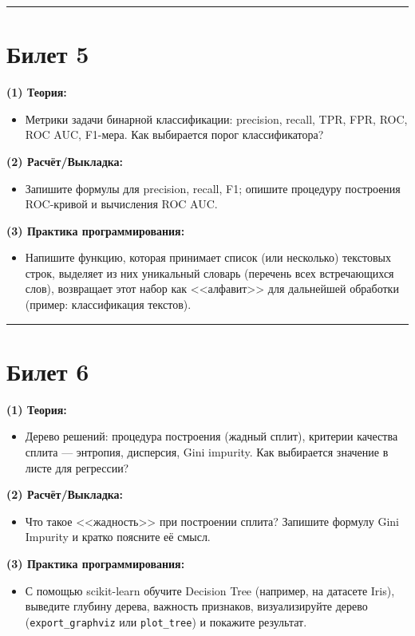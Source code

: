 \documentclass[a4paper,12pt]{article}
\begin{document}
\noindent\rule{\textwidth}{0.4pt}
\newpage

\section*{Билет 5}
\textbf{(1) Теория:}
\begin{itemize}
  \item Метрики задачи бинарной классификации: precision, recall, TPR, FPR, ROC, ROC AUC, F1-мера. Как выбирается порог классификатора?
\end{itemize}

\textbf{(2) Расчёт/Выкладка:}
\begin{itemize}
  \item Запишите формулы для precision, recall, F1; опишите процедуру построения ROC-кривой и вычисления ROC AUC.
\end{itemize}

\textbf{(3) Практика программирования:}
\begin{itemize}
  \item Напишите функцию, которая принимает список (или несколько) текстовых строк, выделяет из них уникальный словарь (перечень всех встречающихся слов), возвращает этот набор как <<алфавит>> для дальнейшей обработки (пример: классификация текстов).
\end{itemize}

\noindent\rule{\textwidth}{0.4pt}

\section*{Билет 6}
\textbf{(1) Теория:}
\begin{itemize}
  \item Дерево решений: процедура построения (жадный сплит), критерии качества сплита --- энтропия, дисперсия, Gini impurity. Как выбирается значение в листе для регрессии?
\end{itemize}

\textbf{(2) Расчёт/Выкладка:}
\begin{itemize}
  \item Что такое <<жадность>> при построении сплита? Запишите формулу Gini Impurity и кратко поясните её смысл.
\end{itemize}

\textbf{(3) Практика программирования:}
\begin{itemize}
  \item С помощью scikit-learn обучите Decision Tree (например, на датасете Iris), выведите глубину дерева, важность признаков, визуализируйте дерево (\texttt{export\_graphviz} или \texttt{plot\_tree}) и покажите результат.
\end{itemize}
\end{document}
